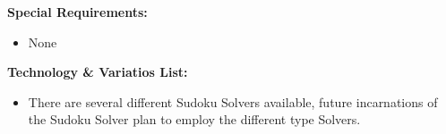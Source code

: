 \documentclass[letterpaper]{article}
\begin{document}
\textbf{Special Requirements:}
\begin{itemize}
\item None
\end{itemize}
\textbf{Technology \& Variatios List:}
\begin{itemize}
\item There are several different Sudoku Solvers available, future
incarnations of the Sudoku Solver plan to employ the different type
Solvers.
\end{itemize}
\end{document}
